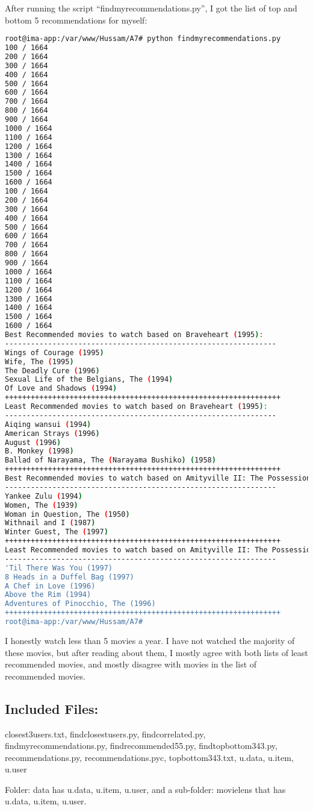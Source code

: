 \documentclass[a4paper, 11pt]{article}
\begin{document}
After running the script ``findmyrecommendations.py'', I got the list of top and bottom 5 recommendations for myself:

\begin{lstlisting}[language=bash, breakatwhitespace=〈false), label=Running findmyrecommendations.py, caption=Running findmyrecommendations.py]
root@ima-app:/var/www/Hussam/A7# python findmyrecommendations.py
100 / 1664
200 / 1664
300 / 1664
400 / 1664
500 / 1664
600 / 1664
700 / 1664
800 / 1664
900 / 1664
1000 / 1664
1100 / 1664
1200 / 1664
1300 / 1664
1400 / 1664
1500 / 1664
1600 / 1664
100 / 1664
200 / 1664
300 / 1664
400 / 1664
500 / 1664
600 / 1664
700 / 1664
800 / 1664
900 / 1664
1000 / 1664
1100 / 1664
1200 / 1664
1300 / 1664
1400 / 1664
1500 / 1664
1600 / 1664
Best Recommended movies to watch based on Braveheart (1995):
---------------------------------------------------------------
Wings of Courage (1995)
Wife, The (1995)
The Deadly Cure (1996)
Sexual Life of the Belgians, The (1994)
Of Love and Shadows (1994)
++++++++++++++++++++++++++++++++++++++++++++++++++++++++++++++++
Least Recommended movies to watch based on Braveheart (1995):
---------------------------------------------------------------
Aiqing wansui (1994)
American Strays (1996)
August (1996)
B. Monkey (1998)
Ballad of Narayama, The (Narayama Bushiko) (1958)
++++++++++++++++++++++++++++++++++++++++++++++++++++++++++++++++
Best Recommended movies to watch based on Amityville II: The Possession (1982):
---------------------------------------------------------------
Yankee Zulu (1994)
Women, The (1939)
Woman in Question, The (1950)
Withnail and I (1987)
Winter Guest, The (1997)
++++++++++++++++++++++++++++++++++++++++++++++++++++++++++++++++
Least Recommended movies to watch based on Amityville II: The Possession (1982):
---------------------------------------------------------------
'Til There Was You (1997)
8 Heads in a Duffel Bag (1997)
A Chef in Love (1996)
Above the Rim (1994)
Adventures of Pinocchio, The (1996)
++++++++++++++++++++++++++++++++++++++++++++++++++++++++++++++++
root@ima-app:/var/www/Hussam/A7#
\end{lstlisting}

I honestly watch less than 5 movies a year. I have not watched the majority of these movies, but after reading about them, I mostly agree with both lists of least recommended movies, and mostly disagree with movies in the list of recommended movies. 

\subsection*{Included Files:}
closest3users.txt, findclosestusers.py, findcorrelated.py, findmyrecommendations.py, findrecommended55.py, findtopbottom343.py, recommendations.py, recommendations.pyc, topbottom343.txt, u.data, u.item, u.user

Folder: data has u.data, u.item, u.user, and a sub-folder: movielens that has u.data, u.item, u.user.
\end{document}
